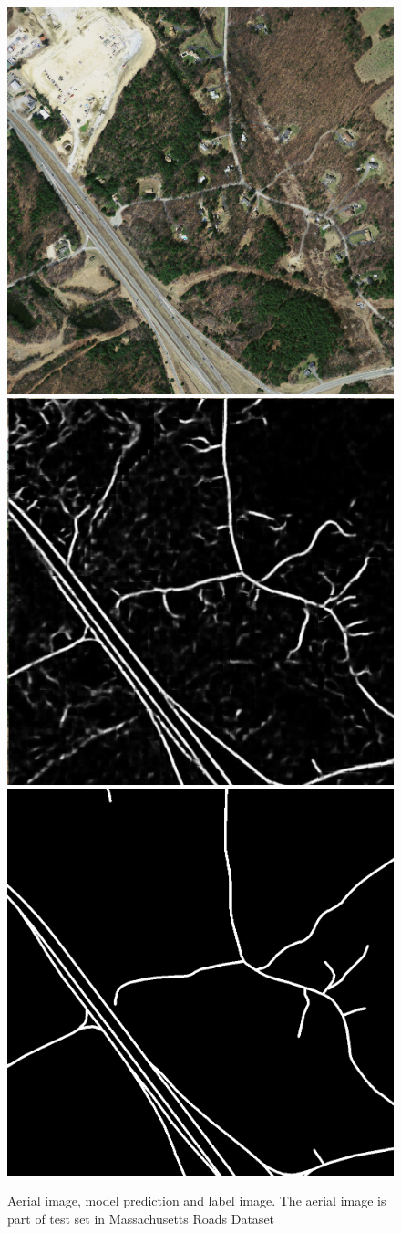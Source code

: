 \begin{figure}[t]
\centering
\includegraphics[width=.32\textwidth]{figs/results_data.jpg}\hfill
\includegraphics[width=.32\textwidth]{figs/results_label.jpg}\hfill
\includegraphics[width=.32\textwidth]{figs/label.png}

\caption{Aerial image, model prediction and label image. The aerial image is part of test set in Massachusetts Roads Dataset}
\label{fig:result}
\end{figure}